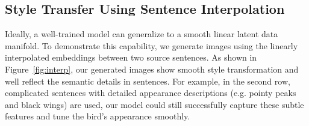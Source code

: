 \documentclass[10pt,twocolumn,letterpaper]{article}
\begin{document}
\subsection{Style Transfer Using Sentence Interpolation}
Ideally, a well-trained model can generalize to a smooth linear latent data manifold. To demonstrate this capability, we generate images using the linearly interpolated embeddings between two source sentences. 
As shown in Figure~\ref{fig:interp}, our generated images show smooth style transformation and well reflect the semantic details in sentences. 
For example, in the second row, complicated sentences with detailed appearance descriptions (e.g. pointy peaks and black wings) are used, our model could still successfully capture these subtle features and tune the bird's appearance smoothly. 



\end{document}
